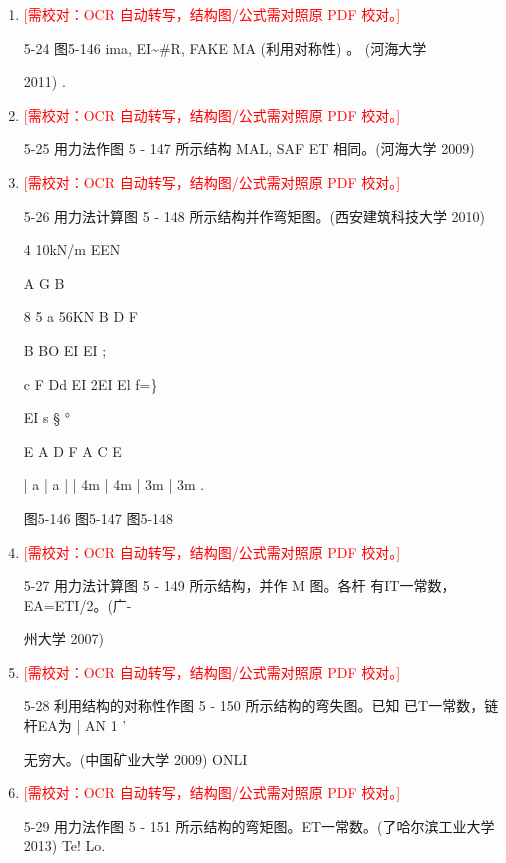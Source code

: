 \documentclass[UTF8,12pt,a4paper,openany]{ctexbook}
\newcommand{\TODO}[1]{\textcolor{red}{[需校对：#1]}}
\begin{document}
\begin{enumerate}[label=\textbf{\arabic*.},leftmargin=2em]
\item \TODO{OCR 自动转写，结构图/公式需对照原 PDF 校对。}\par 5-24 图5-146 ima, EI\textasciitilde{}\#R, FAKE MA (利用对称性) 。 (河海大学\par 2011)                              .
\item \TODO{OCR 自动转写，结构图/公式需对照原 PDF 校对。}\par 5-25 用力法作图 5 - 147 所示结构 MAL, SAF ET 相同。(河海大学 2009)
\item \TODO{OCR 自动转写，结构图/公式需对照原 PDF 校对。}\par 5-26 用力法计算图 5 - 148 所示结构并作弯矩图。(西安建筑科技大学 2010)\par 4                           10kN/m         EEN\par A        G      B\par 8              5             a        56KN B          D        F\par B                BO             EI          EI       ;\par c        F      Dd                                             EI              2EI    El     f=\}\par EI               s                            §                                      °\par E                  A        D       F                   A           C        E\par |     a     |      a    |             |    4m   |    4m    | 3m     |     3m         .\par 图5-146                图5-147                  图5-148
\item \TODO{OCR 自动转写，结构图/公式需对照原 PDF 校对。}\par 5-27 用力法计算图 5 - 149 所示结构，并作 M 图。各杆 有IT一常数，EA=ETI/2。(广-\par 州大学 2007)
\item \TODO{OCR 自动转写，结构图/公式需对照原 PDF 校对。}\par 5-28 利用结构的对称性作图 5 - 150 所示结构的弯失图。已知 已T一常数，链杆EA为 | AN 1 '\par 无穷大。(中国矿业大学 2009)                                                                   ONLI
\item \TODO{OCR 自动转写，结构图/公式需对照原 PDF 校对。}\par 5-29 用力法作图 5 - 151 所示结构的弯矩图。ET一常数。(了哈尔滨工业大学 2013) Te!  Lo.

\end{enumerate}
\end{document}
